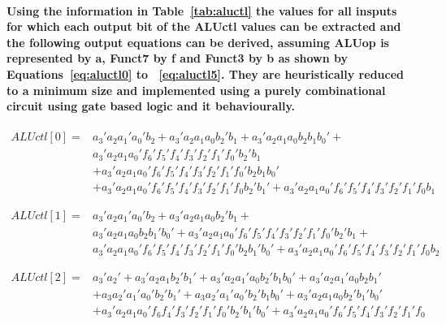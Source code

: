 \documentclass[12pt,a4paper]{report}
\begin{document}
\paragraph{\textrm{\textmd{Using the information in Table~\ref{tab:aluctl} the values for all insputs for which each output bit of the \textbf{ALUctl} values can be extracted and the following output equations can be derived, assuming \textbf{ALUop} is represented by \textbf{a}, \textbf{Funct7} by \textbf{f} and \textbf{Funct3} by \textbf{b} as shown by Equations~\ref{eq:aluctl0} to ~\ref{eq:aluctl5}. They are heuristically reduced to a minimum size and implemented using a purely combinational circuit using gate based logic and it behaviourally.}}}

\begin{equation}
\begin{aligned}
ALUctl[0] =  & a_3'a_2a_1'a_0'b_2 + a_3'a_2a_1a_0b_2'b_1 + a_3'a_2a_1a_0b_2b_1b_0' +  \\
& a_3'a_2a_1a_0'f_6'f_5'f_4'f_3'f_2'f_1'f_0'b_2'b_1 \\ 
&+ a_3'a_2a_1a_0'f_6'f_5'f_4'f_3'f_2'f_1'f_0'b_2b_1b_0' \\
& +a_3'a_2a_1a_0'f_6'f_5'f_4'f_3'f_2'f_1'f_0b_2'b_1' + a_3'a_2a_1a_0'f_6'f_5'f_4'f_3'f_2'f_1'f_0b_1 
\end{aligned}
\label{eq:aluctl0}
\end{equation}

\begin{equation}
\begin{aligned}
ALUctl[1] = & a_3'a_2a_1'a_0'b_2 + a_3'a_2a_1a_0b_2'b_1 + \\
&  a_3'a_2a_1a_0b_2b_1'b_0' + a_3'a_2a_1a_0'f_6'f_5'f_4'f_3'f_2'f_1'f_0'b_2'b_1 + \\
& a_3'a_2a_1a_0'f_6'f_5'f_4'f_3'f_2'f_1'f_0'b_2b_1'b_0' + a_3'a_2a_1a_0'f_6'f_5'f_4'f_3'f_2'f_1'f_0b_2
\end{aligned}
\label{eq:aluctl1}
\end{equation}

\begin{equation}
\begin{aligned}
ALUctl[2] = & a_3'a_2' + a_3'a_2a_1b_2'b_1' + a_3'a_2a_1'a_0b_2'b_1b_0' 
 + a_3'a_2a_1'a_0b_2b_1' \\
 &+ a_3 a_2'a_1'a_0'b_2'b_1' + a_3a_2'a_1'a_0'b_2'b_1b_0'  + a_3'a_2a_1a_0b_2'b_1'b_0'\\
 & + a_3'a_2a_1a_0'f_6f_4'f_3'f_2'f_1'f_0'b_2'b_1'b_0'  + a_3'a_2a_1a_0'f_6'f_5'f_4'f_3'f_2'f_1'f_0
\end{aligned}
\label{eq:aluctl2}
\end{equation}
\end{document}
